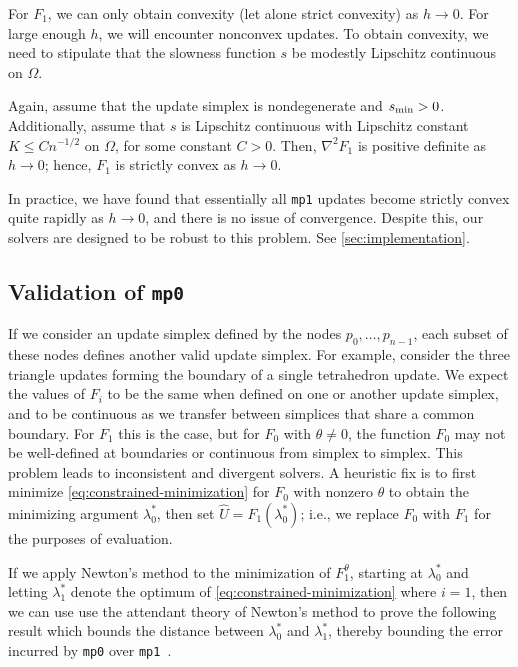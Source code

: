 \documentclass[sisc-eikonal.tex]{subfiles}
\begin{document}
For $F_1$, we can only obtain convexity (let alone strict convexity)
as $h \to 0$. For large enough $h$, we will encounter nonconvex
updates. To obtain convexity, we need to stipulate that the slowness
function $s$ be modestly Lipschitz continuous on $\Omega$.

\begin{lemma}\label{lemma:F-strictly-convex}
  Again, assume that the update simplex is nondegenerate and $s_{\operatorname{min}} >
  0$. Additionally, assume that
  $s$ is Lipschitz continuous with Lipschitz constant $K \leq
  Cn^{-1/2}$ on $\Omega$, for some constant $C > 0$. Then, $\nabla^2
  F_1$ is positive definite as $h \to 0$; hence,
  $F_1$ is strictly convex as $h \to 0$.
\end{lemma}

In practice, we have found that essentially all \texttt{mp1} updates
become strictly convex quite rapidly as $h \to 0$, and there is no
issue of convergence. Despite this, our solvers are designed to be
robust to this problem. See \cref{sec:implementation}.

\subsection{Validation of \texttt{mp0}}\label{ssec:validation}

If we consider an update simplex defined by the nodes
$p_0, \hdots, p_{n-1}$, each subset of these nodes defines another
valid update simplex. For example, consider the three triangle updates
forming the boundary of a single tetrahedron update. We expect the
values of $F_i$ to be the same when defined on one or another update
simplex, and to be continuous as we transfer between simplices that
share a common boundary. For $F_1$ this is the case, but for $F_0$
with $\theta \neq 0$, the function $F_0$ may not be well-defined at
boundaries or continuous from simplex to simplex. This problem leads
to inconsistent and divergent solvers. A heuristic fix is to first
minimize \cref{eq:constrained-minimization} for $F_0$ with nonzero
$\theta$ to obtain the minimizing argument $\lambda^*_0$, then set
$\hat{U} = F_1(\lambda_0^*)$; i.e., we replace $F_0$ with $F_1$ for
the purposes of evaluation.

If we apply Newton's method to the minimization of $F_1^\theta$,
starting at $\lambda_0^*$ and letting $\lambda_1^*$ denote the optimum
of \cref{eq:constrained-minimization} where $i = 1$, then we can use
use the attendant theory of Newton's method to prove the following
result which bounds the distance between $\lambda_0^*$ and
$\lambda_1^*$, thereby bounding the error incurred by \texttt{mp0}
over \texttt{mp1}~\cite{stoer2013introduction}.
\end{document}
